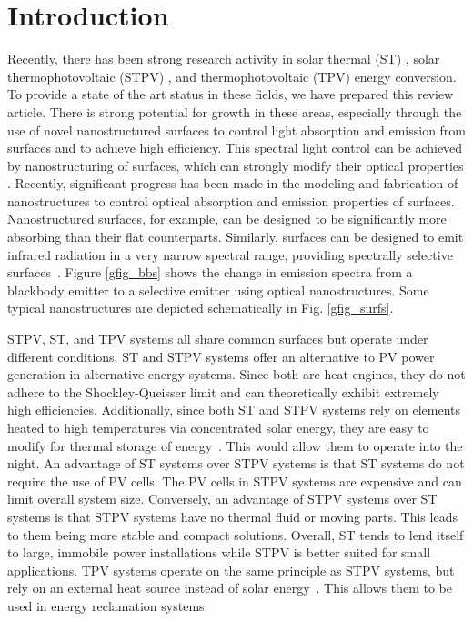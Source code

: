 \documentclass[review]{elsarticle}
\begin{document}
\linenumbers

\providecommand{\noopsort}[1]{}\providecommand{\singleletter}[1]{#1}%
               

\section{Introduction}
Recently, there has been strong research activity in solar thermal (ST) \cite{g1,g2}, solar thermophotovoltaic (STPV) \cite{g3,g4,g5,nnn1}, and thermophotovoltaic (TPV) \cite{g6,g7} energy conversion.  To provide a state of the art status in 
these fields, we have prepared this review article.  There is strong potential for growth in these areas, especially 
through the use of novel nanostructured surfaces to control light absorption and emission from surfaces and to 
achieve high efficiency. This spectral light control can be achieved by nanostructuring of surfaces, 
which can strongly modify their optical properties \cite{g8,g9,RF_OptExp_2009}. Recently, significant progress has been made in the modeling and fabrication of nanostructures to control optical absorption and emission properties of surfaces. 
Nanostructured surfaces, for example, can be designed to be significantly
more absorbing than their flat counterparts.
Similarly, surfaces can be designed to emit infrared radiation in a very narrow spectral range, providing spectrally selective 
surfaces~\cite{G_PS_1985, C_RPP_2014}.  Figure \ref{gfig_bbs} shows the change in 
emission spectra from a blackbody emitter to a selective emitter using optical nanostructures.
Some typical nanostructures are depicted schematically in Fig. \ref{gfig_surfs}.

STPV, ST, and TPV systems all share common surfaces but operate under different conditions.  ST and STPV systems offer an alternative to PV power generation in alternative energy systems.  Since both are heat engines, they do not adhere to the Shockley-Queisser limit and can theoretically exhibit extremely high efficiencies.  Additionally, since both ST and STPV systems rely on elements heated to high temperatures via concentrated solar energy, they are easy to modify for thermal storage of energy~\cite{SteadyStateAnalysis,Night_time_Performance}.  This would allow them to operate into the night.  An advantage of ST systems over STPV systems is that ST systems do not require the use of PV cells.  The PV cells in STPV systems are expensive and can limit overall system size.  Conversely, an advantage of STPV systems over ST systems is that STPV systems have no thermal fluid or moving parts.  This leads to them being more stable and compact solutions.  Overall, ST tends to lend itself to large, immobile power installations while STPV is better suited for small applications.  TPV systems operate on the same principle as STPV systems, but rely on an external heat source instead of solar energy~\cite{Prototype_TPV}.  This allows them to be used in energy reclamation systems.
\end{document}
